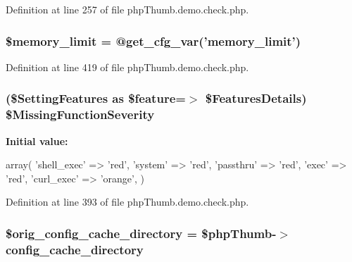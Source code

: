 \-Definition at line 257 of file php\-Thumb.\-demo.\-check.\-php.

\hypertarget{php_thumb_8demo_8check_8php_aa20d90128c90677dcc442774ebc34b60}{
\subsubsection[{\$memory\-\_\-limit}]{\setlength{\rightskip}{0pt plus 5cm}\$memory\-\_\-limit = @get\-\_\-cfg\-\_\-var('memory\-\_\-limit')}}\label{php_thumb_8demo_8check_8php_aa20d90128c90677dcc442774ebc34b60}


\-Definition at line 419 of file php\-Thumb.\-demo.\-check.\-php.

\hypertarget{php_thumb_8demo_8check_8php_a750f7e0c157758d992d263a4000e4d31}{
\subsubsection[{\$\-Missing\-Function\-Severity}]{ (\$\-Setting\-Features as \$feature=$>$ \$\-Features\-Details) \$\-Missing\-Function\-Severity}}\label{php_thumb_8demo_8check_8php_a750f7e0c157758d992d263a4000e4d31}
{\bfseries \-Initial value\-:}
\begin{DoxyCode}
 array(
        'shell_exec' => 'red',
        'system'     => 'red',
        'passthru'   => 'red',
        'exec'       => 'red',
        'curl_exec'  => 'orange',
)
\end{DoxyCode}


\-Definition at line 393 of file php\-Thumb.\-demo.\-check.\-php.

\hypertarget{php_thumb_8demo_8check_8php_a7159b2a785ac35a7a04ffea57d616b0c}{
\subsubsection[{\$orig\-\_\-config\-\_\-cache\-\_\-directory}]{\setlength{\rightskip}{0pt plus 5cm}\$orig\-\_\-config\-\_\-cache\-\_\-directory = \$php\-Thumb-\/$>$config\-\_\-cache\-\_\-directory}}\label{php_thumb_8demo_8check_8php_a7159b2a785ac35a7a04ffea57d616b0c}


